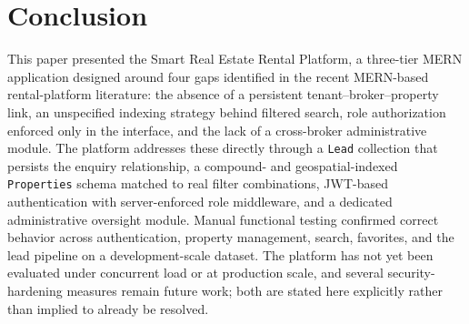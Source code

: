 \documentclass[10pt,twocolumn]{article}
\begin{document}
\section{Conclusion}

This paper presented the Smart Real Estate Rental Platform, a three-tier MERN application designed around four gaps identified in the recent MERN-based rental-platform literature: the absence of a persistent tenant--broker--property link, an unspecified indexing strategy behind filtered search, role authorization enforced only in the interface, and the lack of a cross-broker administrative module. The platform addresses these directly through a \texttt{Lead} collection that persists the enquiry relationship, a compound- and geospatial-indexed \texttt{Properties} schema matched to real filter combinations, JWT-based authentication with server-enforced role middleware, and a dedicated administrative oversight module. Manual functional testing confirmed correct behavior across authentication, property management, search, favorites, and the lead pipeline on a development-scale dataset. The platform has not yet been evaluated under concurrent load or at production scale, and several security-hardening measures remain future work; both are stated here explicitly rather than implied to already be resolved.
\end{document}
